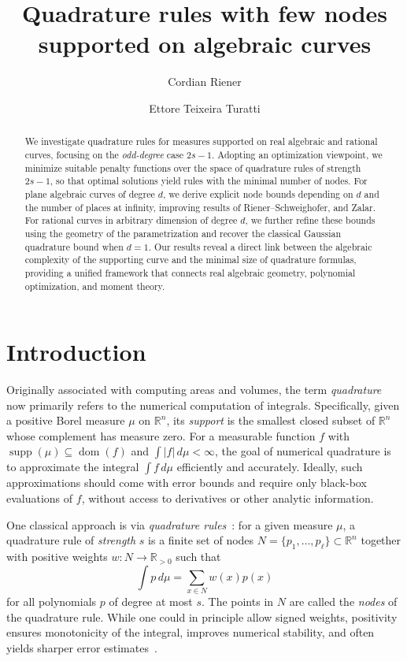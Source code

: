 \documentclass[11pt,a4paper]{amsart}
\title{Quadrature rules with few nodes supported on algebraic curves}
\author{Cordian Riener}
\author{Ettore Teixeira Turatti}
\numberwithin{equation}{section}
\theoremstyle{definition}
\newcommand{\R}{\mathbb{R}}
\numberwithin{thm}{section}
\theoremstyle{break}
\numberwithin{subcase}{case}
\begin{document}
\begin{abstract}
We investigate quadrature rules for measures supported on real algebraic and rational curves, focusing on the \emph{odd-degree} case $2s-1$. Adopting an optimization viewpoint, we minimize suitable penalty functions over the space of quadrature rules of strength $2s-1$, so that optimal solutions yield rules with the minimal number of nodes. For plane algebraic curves of degree $d$, we derive explicit node bounds depending on $d$ and the number of places at infinity, improving results of  Riener--Schweighofer, and Zalar. For rational curves in arbitrary dimension of degree $d$, we further refine these bounds using the geometry of the parametrization and recover the classical Gaussian quadrature bound when $d=1$. Our results reveal a direct link between the algebraic complexity of the supporting curve and the minimal size of quadrature formulas, providing a unified framework that connects real algebraic geometry, polynomial optimization, and moment theory.
\end{abstract}


\maketitle
\section{Introduction} 

Originally associated with computing areas and volumes, the term \emph{quadrature} now primarily refers to the numerical computation of integrals. Specifically, given a {positive  Borel measure} $\mu$ on $\R^n$, its \emph{support} is the smallest closed subset of $\R^n$ whose complement has measure zero. For a measurable function $f$ with $\operatorname{supp}(\mu) \subseteq \operatorname{dom}(f)$ and $\int |f|\, d\mu < \infty$, the goal of numerical quadrature is to approximate the integral $\int f\, d\mu$ efficiently and accurately. Ideally, such approximations should come with error bounds and require only black-box evaluations of $f$, without access to derivatives or other analytic information.  

One classical approach is via \emph{quadrature rules}~\cite{co1}: for a given measure $\mu$, a quadrature rule of \emph{strength} $s$ is a finite set of nodes $N = \{p_1,\ldots,p_\ell\}\subset \R^n$ together with positive weights $w:N\to \R_{>0}$ such that  
\[
\int p\, d\mu = \sum_{x\in N} w(x) p(x)
\]
for all polynomials $p$ of degree at most $s$. The points in $N$ are called the \emph{nodes} of the quadrature rule. While one could in principle allow signed weights, positivity ensures monotonicity of the integral, improves numerical stability, and often yields sharper error estimates~\cite[Conclusion~3.19]{hac}.  
\end{document}
